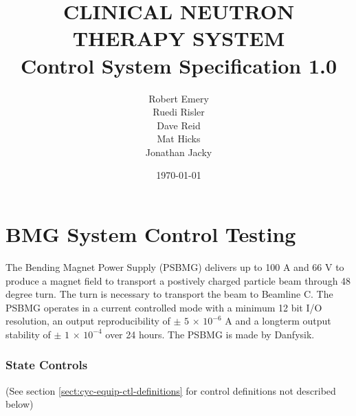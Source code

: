 \documentclass[11pt]{book}		%
\title{CLINICAL NEUTRON THERAPY SYSTEM\\
	Control System Specification 1.0\\[1.0cm]}
\author{Robert Emery\\
	Ruedi Risler\\
	Dave Reid \\
	Mat Hicks \\
        Jonathan Jacky}
\date{\today}
\begin{document}
\chapter{BMG System Control Testing}

The Bending Magnet Power Supply (PSBMG) delivers up to 100 A and 66 V to produce a magnet field to transport a postively charged particle beam through 48 degree turn. The turn is necessary to transport the beam to Beamline C. The PSBMG operates in a current controlled mode with a minimum 12 bit I/O resolution, an output reproducibility of $\pm$ $5$ $\times$ $10^{-6}$ A and a longterm output stability of $\pm$ $1$ $\times$ $10^{-4}$ over 24 hours. The PSBMG is made by Danfysik. 

\subsection{State Controls} \label{sect:cyc-equip-ctl-beamline-gcc-state-controls}
(See section \ref{sect:cyc-equip-ctl-definitions} for control definitions not described below)
\end{document}
